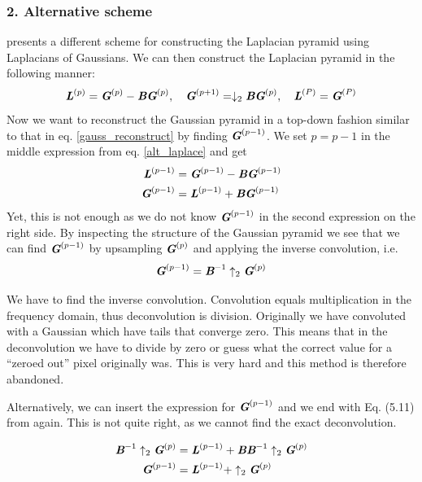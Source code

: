 \documentclass[a4paper, 10pt, final]{article}
\begin{document}
\subsubsection*{2. Alternative scheme}
\citep[exercise 5.3]{jahne-digital} presents a different scheme for
constructing the Laplacian pyramid using Laplacians of Gaussians. We can
then construct the Laplacian pyramid in the following manner:
\begin{equation}
    \textbf{\em L}^{(p)} = \textbf{\em G}^{(p)} - \textbf{\em BG}^{(p)}, ~~~
    \textbf{\em G}^{(p + 1)} = \downarrow_2 \textbf{\em BG}^{(p)}, ~~~
    \textbf{\em L}^{(P)} = \textbf{\em G}^{(P)}
    \label{alt_laplace}
\end{equation}
Now we want to reconstruct the Gaussian pyramid in a top-down fashion
similar to that in eq. \eqref{gauss_reconstruct} by finding
$\textbf{\em G}^{(p - 1)}$. We set $p = p - 1$ in the middle expression from eq.
\eqref{alt_laplace} and get
\begin{align}
    \textbf{\em L}^{(p - 1)} & = \textbf{\em G}^{(p - 1)} - \textbf{\em BG}^{(p - 1)}\\
    \textbf{\em G}^{(p - 1)} &= \textbf{\em L}^{(p - 1)} + \textbf{\em BG}^{(p - 1)}
\end{align}
Yet, this is not enough as we do not know $\textbf{\em G}^{(p - 1)}$ in the
second expression on the right side. By inspecting the structure of the
Gaussian pyramid we see that we can find $\textbf{\em G}^{(p - 1)}$ by
upsampling $\textbf{\em G}^{(p)}$ and applying the inverse convolution, i.e.
\begin{equation}
    \textbf{\em G}^{(p - 1)} = \textbf{\em B}^{-1}\uparrow_2\textbf{\em G}^{(p)}
\end{equation}

We have to find the inverse convolution. Convolution equals
multiplication in the frequency domain, thus deconvolution is division.
Originally we have convoluted with a Gaussian which have tails that
converge zero. This means that in the deconvolution we have to divide by
zero or guess what the correct value for a ``zeroed out'' pixel
originally was. This is very hard and this method is therefore
abandoned.

Alternatively, we can insert the expression for $\textbf{\em G}^{(p - 1)}$
and we end with Eq. (5.11) from \citep{jahne-digital} again. This is not
quite right, as we cannot find the exact deconvolution.

\begin{align}
    \textbf{\em B}^{-1}\uparrow_2\textbf{\em G}^{(p)} & = \textbf{\em L}^{(p - 1)} + \textbf{\em BB}^{-1}\uparrow_2\textbf{\em G}^{(p)}\\
    \textbf{\em G}^{(p - 1)} & = \textbf{\em L}^{(p - 1)} + \uparrow_2\textbf{\em G}^{(p)}\\
\end{align}
\end{document}
